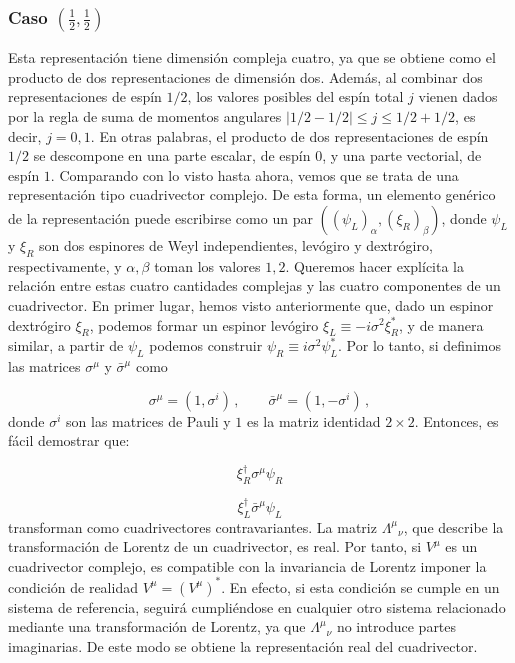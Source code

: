 \documentclass[a4paper,11pt]{book} %
\begin{document}
\subsubsection*{Caso $\left(\tfrac{1}{2}, \tfrac{1}{2}\right)$}
\noindent 
Esta representación tiene dimensión compleja cuatro, ya que se obtiene como el producto de dos representaciones de dimensión dos. Además, al combinar dos representaciones de espín \(1/2\), los valores posibles del espín total \(j\) vienen dados por la regla de suma de momentos angulares $|1/2 - 1/2| \leqslant j \leqslant 1/2 + 1/2$, es decir, $j = 0, 1$.
\medskip\newline
En otras palabras, el producto de dos representaciones de espín \(1/2\) se descompone en una parte escalar, de espín \(0\), y una parte vectorial, de espín \(1\). 
\medskip\newline
Comparando con lo visto hasta ahora, vemos que se trata de una representación
tipo cuadrivector complejo. De esta forma, un elemento genérico de la representación
puede escribirse como un par $((\psi_L)_\alpha, (\xi_R)_\beta)$, donde $\psi_L$ y
$\xi_R$ son dos espinores de Weyl independientes, levógiro y dextrógiro,
respectivamente, y $\alpha, \beta$ toman los valores $1, 2$. 
\medskip\newline
Queremos hacer
explícita la relación entre estas cuatro cantidades complejas y las cuatro
componentes de un cuadrivector. En primer lugar, hemos visto anteriormente que, dado un espinor dextrógiro
$\xi_R$, podemos formar un espinor levógiro $\xi_L \equiv -i\sigma^2 \xi_R^*$, y
de manera similar, a partir de $\psi_L$ podemos construir
$\psi_R \equiv i\sigma^2 \psi_L^*$.
\medskip\newline
Por lo tanto, si definimos las matrices $\sigma^\mu$ y
$\bar{\sigma}^\mu$ como

\begin{equation}
\sigma^\mu = (1, \sigma^i) \, , \qquad
\bar{\sigma}^\mu = (1, -\sigma^i) \, ,
\end{equation}
\noindent
donde $\sigma^i$ son las matrices de Pauli y $1$ es la matriz identidad
$2 \times 2$. Entonces, es fácil demostrar que:
 
\begin{equation}
\xi_R^\dagger \sigma^\mu \psi_R
\end{equation}
 
\begin{equation}
\xi_L^\dagger \bar{\sigma}^\mu \psi_L
\end{equation}
\noindent
transforman como cuadrivectores contravariantes. 
\medskip\newline
La matriz $\Lambda^\mu{}_\nu$, que describe la transformación de Lorentz de un cuadrivector, es real. Por tanto, si $V^\mu$ es un cuadrivector complejo, es compatible con la invariancia de Lorentz imponer la condición de realidad $V^\mu = (V^\mu)^*.$
En efecto, si esta condición se cumple en un sistema de referencia, seguirá cumpliéndose en cualquier otro sistema relacionado mediante una transformación de Lorentz, ya que $\Lambda^\mu{}_\nu$ no introduce partes imaginarias. De este modo se obtiene la representación real del cuadrivector.
\end{document}
